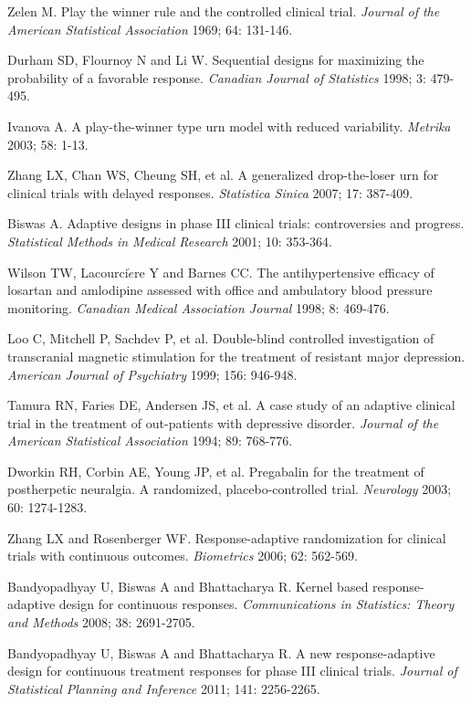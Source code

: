 \begin{thebibliography}
 Zelen M. Play the winner rule and the controlled clinical trial. \textit{Journal of the American Statistical Association}  1969; 64: 131-146.

 Durham SD, Flournoy N and Li W. Sequential designs for maximizing the probability of a favorable response. \textit{Canadian Journal of Statistics} 1998; 3: 479-495.

 Ivanova A. A play-the-winner type urn model with reduced variability. \textit{Metrika} 2003; 58: 1-13.

 Zhang LX, Chan WS, Cheung SH, et al. A generalized drop-the-loser urn for clinical trials with delayed responses. \textit{Statistica Sinica} 2007; 17: 387-409.

 Biswas A. Adaptive designs in phase III clinical trials: controversies and progress. \textit{Statistical Methods in Medical Research} 2001; 10: 353-364.

 Wilson TW,  Lacourci$\grave{e}$re Y and  Barnes CC. The antihypertensive efficacy of losartan and amlodipine assessed with office and ambulatory blood pressure monitoring. \textit{Canadian Medical Association Journal} 1998; 8: 469-476.

 Loo C, Mitchell P, Sachdev P, et al. Double-blind controlled investigation of transcranial magnetic stimulation for the treatment of resistant major depression. \textit{American Journal of Psychiatry} 1999; 156: 946-948.

 Tamura RN, Faries DE, Andersen JS, et al. A case study of an adaptive clinical trial in the treatment of out-patients with depressive disorder. \textit{Journal of the American Statistical Association} 1994; 89: 768-776.

 Dworkin RH, Corbin AE, Young JP, et al. Pregabalin for the treatment of  postherpetic neuralgia. A randomized, placebo-controlled trial. \textit{Neurology} 2003; 60: 1274-1283.

 Zhang LX and Rosenberger WF.  Response-adaptive randomization for clinical trials with continuous outcomes. \textit{Biometrics} 2006; 62: 562-569.

 Bandyopadhyay U, Biswas A  and Bhattacharya R. Kernel based response-adaptive design for continuous responses. \textit{Communications in Statistics: Theory and Methods} 2008; 38: 2691-2705.

 Bandyopadhyay U, Biswas A  and Bhattacharya R. A new response-adaptive design for continuous treatment responses for phase III clinical trials.  \textit{Journal of Statistical Planning and Inference} 2011; 141: 2256-2265.


\end{thebibliography}
